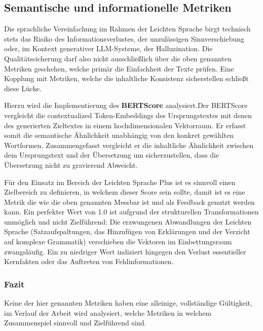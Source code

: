\subsection{Semantische und informationelle Metriken}
Die sprachliche Vereinfachung im Rahmen der Leichten Sprache birgt technisch stets das Risiko des Informationsverlustes, der unzulässigen Sinnverschiebung oder, im Kontext generativer LLM-Systeme, der Halluzination. 
Die Qualitätssicherung darf also nicht ausschließlich über die oben genannten Metriken geschehen, welche primär die Einfachheit der Texte prüfen.
Eine Kopplung mit Metriken, welche die inhaltliche Konsistenz sicherstellen schließt diese Lücke.

Hierzu wird die Implementierung des \textbf{BERTScore} analysiert.Der BERTScore vergleicht die contextualized Token-Embeddings des Ursprungstextes mit denen des generierten Zieltextes in einem hochdimensionalen Vektorraum. Er erfasst somit die semantische Ähnlichkeit unabhängig von den konkret gewählten Wortformen.
Zusammengefasst vergleicht er die inhaltliche Ähnlichkeit zwischen dem Ursprungstext und der Übersetzung um sicherzustellen, dass die Übersetzung nicht zu gravierend Abweicht.

Für den Einsatz im Bereich der Leichten Sprache Plus ist es sinnvoll einen Zielbereich zu definieren, in welchem dieser Score sein sollte, damit ist es eine Metrik die wie die oben genannten Messbar ist und als Feedback genutzt werden kann. Ein perfekter Wert von 1.0 ist aufgrund der strukturellen Transformationen unmöglich und nicht Zielführend: Die erzwungenen Abwandlungen der Leichten Sprache (Satzaufspaltungen, das Hinzufügen von Erklärungen und der Verzicht auf komplexe Grammatik) verschieben die Vektoren im Einbettungsraum zwangsläufig. Ein zu niedriger Wert indiziert hingegen den Verlust essentieller Kernfakten oder das Auftreten von Fehlinformationen.

\subsubsection{Fazit}
Keine der hier genannten Metriken haben eine alleinige, vollständige Gültigkeit, im Verlauf der Arbeit wird analysiert, welche Metriken in welchem Zusammenspiel sinnvoll und Zielführend sind.